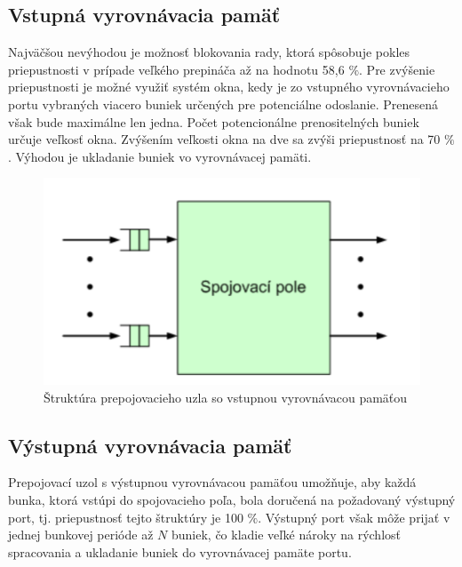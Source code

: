 \subsection{Vstupná vyrovnávacia pamäť}
Najväčšou nevýhodou je možnosť blokovania rady, ktorá spôsobuje pokles priepustnosti v prípade veľkého prepináča až na hodnotu 58,6 $\%$. Pre zvýšenie priepustnosti je možné využiť systém okna, kedy je zo vstupného vyrovnávacieho portu vybraných viacero buniek určených pre potenciálne odoslanie. Prenesená však bude maximálne len jedna. Počet potencionálne prenositelných buniek určuje veľkosť okna. Zvýšením veľkosti okna na dve sa zvýši priepustnosť na 70 $\%$. Výhodou je ukladanie buniek vo vyrovnávacej pamäti.

\begin{figure}[ht]
\centering
  \begin{center}
    \includegraphics[scale=0.8]{images/propoj_vstup.png}
  \end{center}
  \caption[Štruktúra prepojovacieho uzla so vstupnou vyrovnávacou pamäťou]{Štruktúra prepojovacieho uzla so vstupnou vyrovnávacou pamäťou}
\end{figure}

\subsection{Výstupná vyrovnávacia pamäť}
Prepojovací uzol s výstupnou vyrovnávacou pamäťou umožňuje, aby každá bunka, ktorá vstúpi do spojovacieho poľa, bola doručená na požadovaný výstupný port, tj. priepustnosť tejto štruktúry je 100 $\%$. Výstupný port však môže prijať v jednej bunkovej perióde až $N$ buniek, čo kladie veľké nároky na rýchlosť spracovania a ukladanie buniek do vyrovnávacej pamäte portu.

